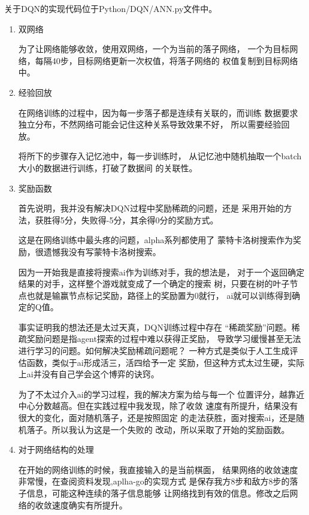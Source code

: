 \documentclass[UTF8]{article}
\begin{document}
关于DQN的实现代码位于Python/DQN/ANN.py文件中。

\begin{enumerate}
    \item 双网络
    
    \subitem 为了让网络能够收敛，使用双网络，一个为当前的落子网络，
    一个为目标网络，每隔40步，目标网络更新一次权值，将落子网络的
    权值复制到目标网络中。

    \item 经验回放
    
    \subitem 在网络训练的过程中，因为每一步落子都是连续有关联的，而训练
    数据要求独立分布，不然网络可能会记住这种关系导致效果不好，
    所以需要经验回放。
    
    \subitem 将所下的步骤存入记忆池中，每一步训练时，
    从记忆池中随机抽取一个batch大小的数据进行训练，打破了数据间
    的关联性。

    \item 奖励函数
    
    \subitem 首先说明，我并没有解决DQN过程中奖励稀疏的问题，还是
    采用开始的方法，获胜得5分，失败得-5分，其余得0分的奖励方式。

    \subitem 这是在网络训练中最头疼的问题，alpha系列都使用了
    蒙特卡洛树搜索作为奖励，很遗憾我没有写蒙特卡洛树搜索。

    \subitem 因为一开始我是直接将搜索ai作为训练对手，我的想法是，
    对于一个返回确定结果的对手，这样整个游戏就变成了一个确定的搜索
    树，只要在树的叶子节点也就是输赢节点标记奖励，路径上的奖励置为0就行，
    ai就可以训练得到确定的Q值。

    \subitem 事实证明我的想法还是太过天真，DQN训练过程中存在
    “稀疏奖励”问题。稀疏奖励问题是指agent探索的过程中难以获得正奖励，
    导致学习缓慢甚至无法进行学习的问题。如何解决奖励稀疏问题呢？
    一种方式是类似于人工生成评估函数，类似于ai形成活三，活四给予一定
    奖励，但这种方式太过生硬，实际上ai并没有自己学会这个博弈的诀窍。

    \subitem 为了不太过介入ai的学习过程，我的解决方案为给与每一个
    位置评分，越靠近中心分数越高。但在实践过程中我发现，除了收敛
    速度有所提升，结果没有很大的变化，面对随机落子，还是按照固定
    的走法获胜，面对搜索ai，还是随机落子。所以我认为这是一个失败的
    改动，所以采取了开始的奖励函数。
    
    \item 对于网络结构的处理
    
    \subitem 在开始的网络训练的时候，我直接输入的是当前棋面，
    结果网络的收敛速度非常慢，在查阅资料发现,aplha-go的实现方式
    是保存我方8步和敌方8步的落子信息，可能这种连续的落子信息能够
    让网络找到有效的信息。修改之后网络的收敛速度确实有所提升。
    
\end{enumerate}
\end{document}
